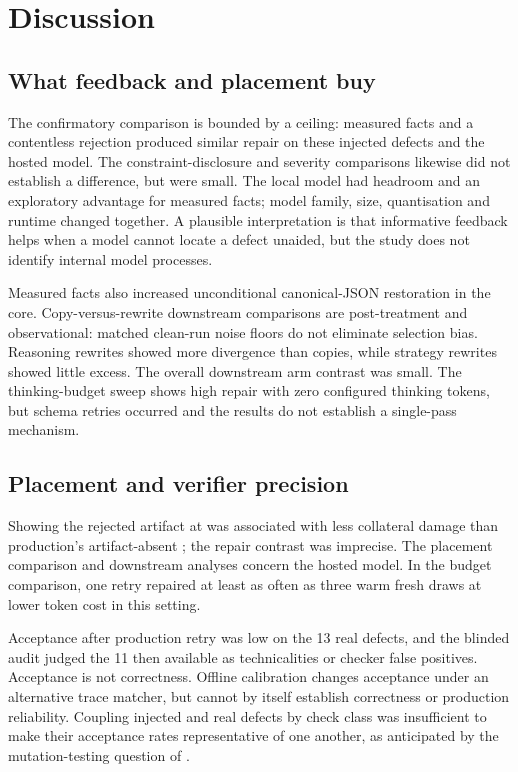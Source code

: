 \section{Discussion}
\label{sec:discussion}

\subsection{What feedback and placement buy}
\label{sec:discussion-content}
The confirmatory comparison is bounded by a ceiling: measured facts and a
contentless rejection produced similar repair on these injected defects and the
hosted model. The constraint-disclosure and severity comparisons likewise did
not establish a difference, but were small. The local model had headroom and an
exploratory advantage for measured facts; model family, size, quantisation and
runtime changed together. A plausible interpretation is that informative
feedback helps when a model cannot locate a defect unaided, but the study does
not identify internal model processes.

Measured facts also increased unconditional canonical-JSON restoration in the
core. Copy-versus-rewrite downstream comparisons are post-treatment and
observational: matched clean-run noise floors do not eliminate selection bias.
Reasoning rewrites showed more divergence than copies, while strategy rewrites
showed little excess. The overall downstream arm contrast was small. The
thinking-budget sweep shows high repair with zero configured thinking tokens,
but schema retries occurred and the results do not establish a single-pass
mechanism.

\subsection{Placement and verifier precision}
\label{sec:discussion-placement}
Showing the rejected artifact at  was associated with less collateral
damage than production's artifact-absent ; the repair contrast was
imprecise. The placement comparison and downstream analyses concern the hosted
model. In the budget comparison, one  retry repaired at least as often as three
warm fresh draws at lower token cost in this setting.

\label{sec:discussion-precision}
Acceptance after production retry was low on the 13 real defects, and the
blinded audit judged the 11 then available as technicalities or checker false
positives. Acceptance is not correctness. Offline calibration changes acceptance
under an alternative trace matcher, but cannot by itself establish correctness
or production reliability. Coupling injected and real defects by check class
was insufficient to make their acceptance rates representative of one another,
as anticipated by the mutation-testing question of \citet{just2014mutants}.

